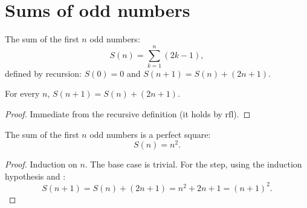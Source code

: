 %
%
\chapter{Sums of odd numbers}

\begin{definition}\label{def:sumOdds}
  \leanok
  The sum of the first $n$ odd numbers:
  $$S(n) = \sum_{k=1}^{n} (2k - 1),$$
  defined by recursion: $S(0) = 0$ and $S(n+1) = S(n) + (2n + 1)$.
\end{definition}

\begin{lemma}\label{lemma:sumOdds-succ}
  \leanok
  For every $n$, $S(n+1) = S(n) + (2n + 1)$.
\end{lemma}
\begin{proof}\leanok
  Immediate from the recursive definition (it holds by $\mathrm{rfl}$).
\end{proof}

\begin{theorem}\label{thm:sumOdds-eq-sq}
  \leanok
  The sum of the first $n$ odd numbers is a perfect square:
  $$S(n) = n^2.$$
\end{theorem}
\begin{proof}\leanok
  Induction on $n$. The base case is trivial. For the step, using the
  induction hypothesis and :
  $$S(n+1) = S(n) + (2n+1) = n^2 + 2n + 1 = (n+1)^2.$$
\end{proof}

